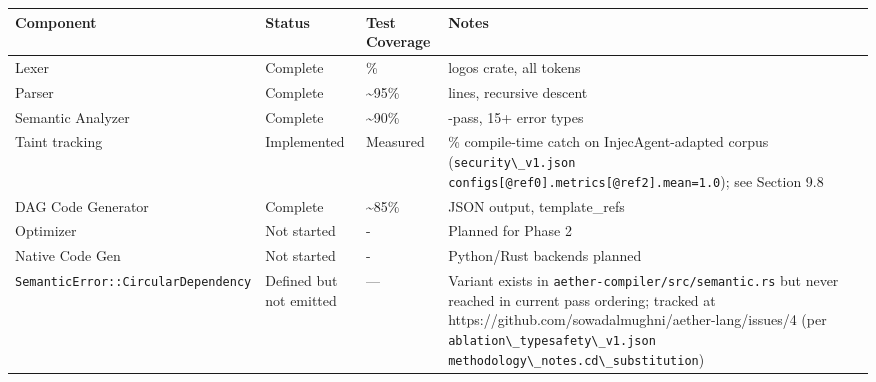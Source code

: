 \documentclass[
]{article}
\newcommand{\passthrough}[1]{#1}
\newcounter{none} %
\begin{document}
{\def\LTcaptype{none} %
\begin{longtable}[]{@{}
  >{\raggedright\arraybackslash}p{}
  >{\raggedright\arraybackslash}p{}
  >{\raggedright\arraybackslash}p{}
  >{\raggedright\arraybackslash}p{}@{}}
\toprule\noalign{}
\begin{minipage}[b]{\linewidth}\raggedright
Component
\end{minipage} & \begin{minipage}[b]{\linewidth}\raggedright
Status
\end{minipage} & \begin{minipage}[b]{\linewidth}\raggedright
Test Coverage
\end{minipage} & \begin{minipage}[b]{\linewidth}\raggedright
Notes
\end{minipage} \\
\midrule\noalign{}
\endhead
\bottomrule\noalign{}
\endlastfoot
Lexer & Complete & 100\% & logos crate, all tokens \\
Parser & Complete & \textasciitilde95\% & 1900 lines, recursive
descent \\
Semantic Analyzer & Complete & \textasciitilde90\% & 5-pass, 15+ error
types \\
Taint tracking & Implemented & Measured & 100\% compile-time catch on
InjecAgent-adapted corpus (\passthrough{\lstinline!security\_v1.json!}
\passthrough{\lstinline!configs[@ref0].metrics[@ref2].mean=1.0!}); see
Section 9.8 \\
DAG Code Generator & Complete & \textasciitilde85\% & JSON output,
template\_refs \\
Optimizer & Not started & - & Planned for Phase 2 \\
Native Code Gen & Not started & - & Python/Rust backends planned \\
\passthrough{\lstinline!SemanticError::CircularDependency!} & Defined
but not emitted & --- & Variant exists in
\passthrough{\lstinline!aether-compiler/src/semantic.rs!} but never
reached in current pass ordering; tracked at
https://github.com/sowadalmughni/aether-lang/issues/4 (per
\passthrough{\lstinline!ablation\_typesafety\_v1.json!}
\passthrough{\lstinline!methodology\_notes.cd\_substitution!}) \\
\end{longtable}
}
\end{document}
